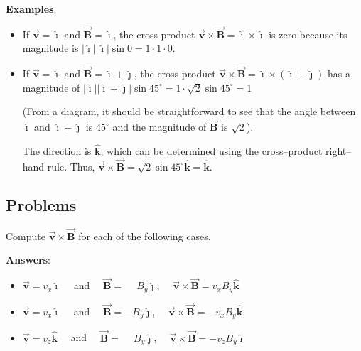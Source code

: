 \documentclass{article}
\newcommand{\ihat}[0]{\hat{\boldsymbol{\imath}}}
\newcommand{\jhat}[0]{\hat{\boldsymbol{\jmath}}}
\newcommand{\khat}[0]{\hat{\boldsymbol{k}}}
\newcommand{\bfvec}[1]{\vec{\mathbf{#1}}}
\begin{document}
\begin{enumerate}
        \textbf{Examples}:

      \begin{itemize}

        \item If $\bfvec{v}=\ihat$ and $\bfvec{B}=\ihat$, the cross product $\bfvec{v}\times\bfvec{B}=\ihat\times\ihat$ is zero because its magnitude is $|\ihat||\ihat|\sin 0 = 1\cdot 1 \cdot 0$.

        \item If $\bfvec{v}=\ihat$ and $\bfvec{B}=\ihat+\jhat$, the cross product $\bfvec{v}\times\bfvec{B}= \ihat\times(\ihat+\jhat)$ has a magnitude of $|\ihat||\ihat+\jhat|\sin 45^\circ = 1\cdot \sqrt{2} \sin 45^\circ = 1$

              (From a diagram, it should be straightforward to see that the angle between $\ihat$ and $\ihat+\jhat$ is $45^\circ$ and the magnitude of $\bfvec{B}$ is $\sqrt{2}$).

              The direction is $\khat$, which can be determined using the cross--product right--hand rule. Thus, $\bfvec{v}\times\bfvec{B}=\sqrt{2} \sin 45^\circ\khat = \khat$.

      \end{itemize}

\end{enumerate}

\ifsolutions

\else

\newpage
\fi

\subsection{Problems}

Compute $\bfvec{v}\times\bfvec{B}$ for each of the following cases.

\ifsolutions
\textbf{Answers}:

    \begin{itemize}

      \item $\bfvec{v}=v_x\ihat\quad$ and $\quad\bfvec{B}=\phantom{-}B_y\jhat$, $\quad\bfvec{v}\times\bfvec{B} = \boxed{v_xB_y\khat}$

      \item $\bfvec{v}=v_x\ihat\quad$ and $\quad\bfvec{B}=-B_y\jhat$, $\quad\bfvec{v}\times\bfvec{B} = \boxed{-v_xB_y\khat}$

      \item $\bfvec{v}=v_z\khat\quad$ and $\quad\bfvec{B}=\phantom{-}B_y\jhat$, $\quad\bfvec{v}\times\bfvec{B} = \boxed{-v_zB_y\ihat}$

    \end{itemize}
\else
\vskip 60pt
\end{document}
